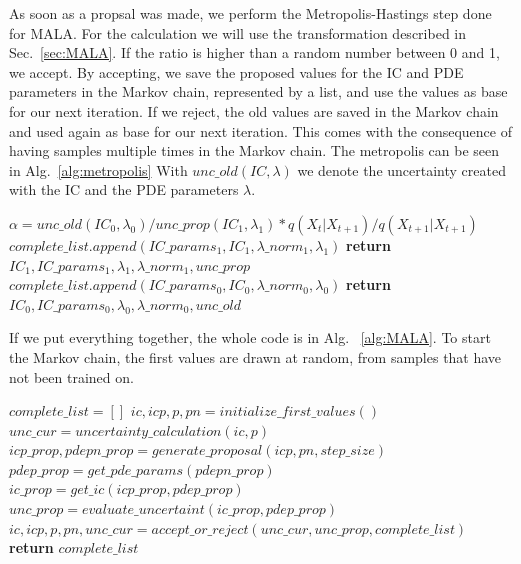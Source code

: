 As soon as a propsal was made, we perform the Metropolis-Hastings step done for MALA. For the calculation we will use the transformation described in Sec.~\ref{sec:MALA}.
If the ratio is higher than a random number between 0 and 1, we accept.
By accepting, we save the proposed values for the IC and PDE parameters in the Markov chain, represented by a list, and use the values
as base for our next iteration. If we reject, the old values are saved in the Markov chain and used
again as base for our next iteration. This comes with the consequence of having samples multiple times
in the Markov chain. The metropolis can be seen in Alg.~\ref{alg:metropolis}
With $unc\_old(IC, \lambda)$ we denote the uncertainty created with the IC and the PDE parameters $\lambda$. 
\begin{Algorithmus}
    \caption{Metropolis-Hastings step}
    \label{alg:metropolis}
    \begin{algorithmic}[1] 
            \State $\alpha = unc\_old(IC_0, \lambda_0)/unc\_prop(IC_1, \lambda_1) * q(X_t|X_{t+1})/q(X_{t+1}|X_{t+1}) $
            \State $complete\_list.append(IC\_params_1, IC_1, \lambda\_norm_1, \lambda_1)$
            \State \textbf{return }$IC_1, IC\_params_1, \lambda_1, \lambda\_norm_1, unc\_prop$
            \Else {}
            \State $complete\_list.append(IC\_params_0, IC_0, \lambda\_norm_0, \lambda_0)$
            \State \textbf{return }$IC_0, IC\_params_0, \lambda_0, \lambda\_norm_0, unc\_old$
            \EndIf
        \EndFunction
    \end{algorithmic}
\end{Algorithmus}
If we put everything together, the whole code is in Alg. ~\ref{alg:MALA}. To start the Markov chain, the first values are drawn at random, from samples that have not been trained on.
 
\begin{Algorithmus}
    \caption{Pseudocode for MALA}
    \label{alg:MALA}
    \begin{algorithmic}[1] 
            \State $complete\_list = []$
            \State $ic, icp, p, pn = initialize\_first\_values()$
            \State $unc\_cur = uncertainty\_calculation(ic, p)$
            \State $icp\_prop, pdepn\_prop = generate\_proposal(icp, pn, step\_size)$
            \State $pdep\_prop = get\_pde\_params(pdepn\_prop)$
            \State $ic\_prop = get\_ic(icp\_prop, pdep\_prop)$
            \State $unc\_prop = evaluate\_uncertaint(ic\_prop, pdep\_prop)$
            \State $ic, icp, p, pn, unc\_cur = accept\_or\_reject(unc\_cur, unc\_prop, complete\_list)$
            \EndFor
        \State \textbf{return } $complete\_list$
        \EndFunction
    \end{algorithmic}
\end{Algorithmus}

